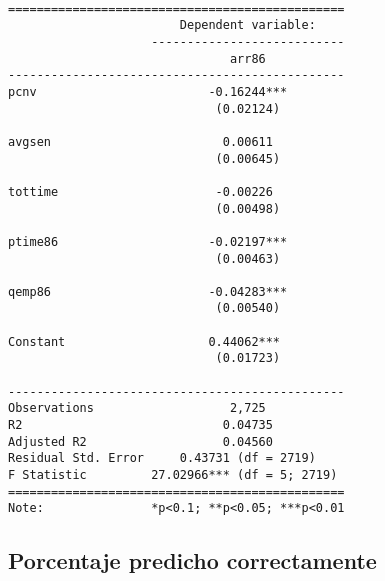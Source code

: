 \documentclass[
  letterpaper,
  DIV=11,
  numbers=noendperiod]{scrreprt}
\begin{document}
\begin{verbatim}

===============================================
                        Dependent variable:    
                    ---------------------------
                               arr86           
-----------------------------------------------
pcnv                        -0.16244***        
                             (0.02124)         
                                               
avgsen                        0.00611          
                             (0.00645)         
                                               
tottime                      -0.00226          
                             (0.00498)         
                                               
ptime86                     -0.02197***        
                             (0.00463)         
                                               
qemp86                      -0.04283***        
                             (0.00540)         
                                               
Constant                    0.44062***         
                             (0.01723)         
                                               
-----------------------------------------------
Observations                   2,725           
R2                            0.04735          
Adjusted R2                   0.04560          
Residual Std. Error     0.43731 (df = 2719)    
F Statistic         27.02966*** (df = 5; 2719) 
===============================================
Note:               *p<0.1; **p<0.05; ***p<0.01
\end{verbatim}

\subsection{Porcentaje predicho
correctamente}\label{porcentaje-predicho-correctamente-1}
\end{document}

